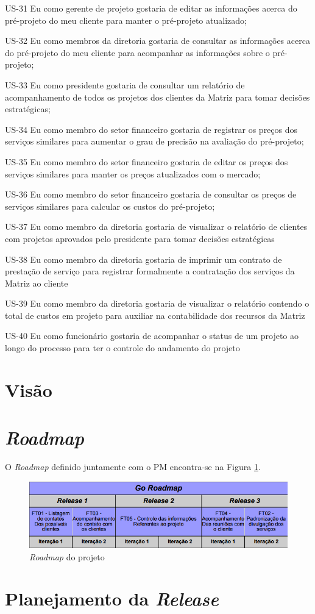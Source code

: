US-31 Eu como gerente de projeto gostaria de editar as informações acerca do pré-projeto do meu cliente para manter o pré-projeto atualizado;


US-32 Eu como membros da diretoria gostaria de consultar as informações acerca do pré-projeto do meu cliente para acompanhar as informações sobre o pré-projeto;


US-33 Eu como presidente gostaria de consultar um relatório de acompanhamento de todos os projetos dos clientes da Matriz para tomar decisões estratégicas;


US-34 Eu como membro do setor financeiro gostaria de registrar os preços dos serviços similares para aumentar o grau de precisão na avaliação do pré-projeto;


US-35 Eu como membro do setor financeiro gostaria de editar os preços dos serviços similares para manter os preços atualizados com o mercado;


US-36 Eu como membro do setor financeiro gostaria de consultar os preços de serviços similares para calcular os custos do pré-projeto;


US-37 Eu como membro da diretoria gostaria de visualizar o relatório de clientes com projetos aprovados pelo presidente para tomar decisões estratégicas


US-38 Eu como membro da diretoria gostaria de imprimir um contrato de prestação de serviço para registrar formalmente a contratação dos serviços da Matriz ao cliente


US-39 Eu como membro da diretoria gostaria de visualizar o relatório contendo o total de custos em projeto para auxiliar na contabilidade dos recursos da Matriz


US-40 Eu como funcionário gostaria de acompanhar o status de um projeto ao longo do processo para ter o controle do andamento do projeto


\section{Visão}

\section{\textit{Roadmap}}

O \textit{Roadmap} definido juntamente com o PM encontra-se na Figura \ref{roadmap}.

\begin{figure}[!htb]
\centering
\includegraphics[scale=0.6]{figuras/roadmap.png}
\caption{\textit{Roadmap} do projeto}
\label{roadmap}
\end{figure}

\section{Planejamento da \textit{Release}}